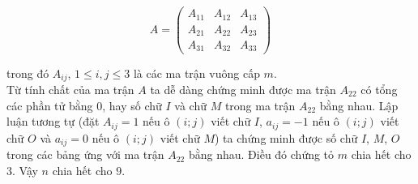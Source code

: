 \begin{bt}[IMO 2016]
{\begin{itemize}
			\begin{equation*}
			A=\begin{pmatrix}
			A_{11} & A_{12} & A_{13} \\
			A_{21} & A_{22} & A_{23}\\
			A_{31} & A_{32} & A_{33}
			\end{pmatrix}
			\end{equation*}
			
			trong đó $A_{ij}$, $1 \le i,j \le 3$ là các ma trận vuông cấp $m$. \\
			Từ tính chất của ma trận $A$ ta dễ dàng chứng minh được ma trận $A_{22}$ có tổng các phần tử bằng $0$, hay số chữ $I$ và chữ $M$ trong ma trận $A_{22}$ bằng nhau. Lập luận tương tự (đặt $A_{ij}=1$ nếu ô $(i;j)$ viết chữ $I$, $a_{ij}=-1$ nếu ô $(i;j)$ viết chữ $O$ và $a_{ij}=0$ nếu ô $(i;j)$ viết chữ $M$) ta chứng minh được số chữ $I$, $M$, $O$ trong các bảng ứng với ma trận $A_{22}$ bằng nhau. Điều đó chứng tỏ $m$ chia hết cho $3$. Vậy $n$ chia hết cho $9$. 
			
		\end{itemize}
	}
\end{bt}

